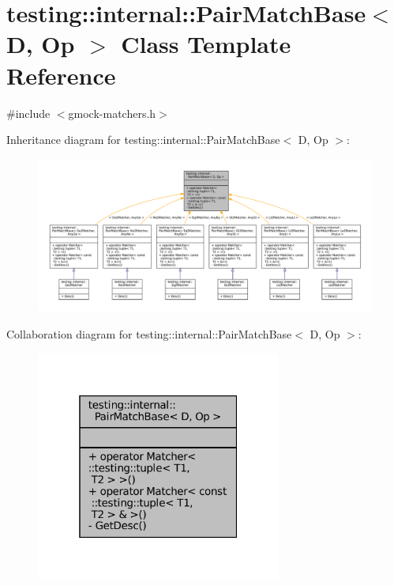 \hypertarget{classtesting_1_1internal_1_1PairMatchBase}{}\section{testing\+:\+:internal\+:\+:Pair\+Match\+Base$<$ D, Op $>$ Class Template Reference}
\label{classtesting_1_1internal_1_1PairMatchBase}


{\ttfamily \#include $<$gmock-\/matchers.\+h$>$}



Inheritance diagram for testing\+:\+:internal\+:\+:Pair\+Match\+Base$<$ D, Op $>$\+:
\nopagebreak
\begin{figure}[H]
\begin{center}
\leavevmode
\includegraphics[width=350pt]{classtesting_1_1internal_1_1PairMatchBase__inherit__graph}
\end{center}
\end{figure}


Collaboration diagram for testing\+:\+:internal\+:\+:Pair\+Match\+Base$<$ D, Op $>$\+:
\nopagebreak
\begin{figure}[H]
\begin{center}
\leavevmode
\includegraphics[width=229pt]{classtesting_1_1internal_1_1PairMatchBase__coll__graph}
\end{center}
\end{figure}
